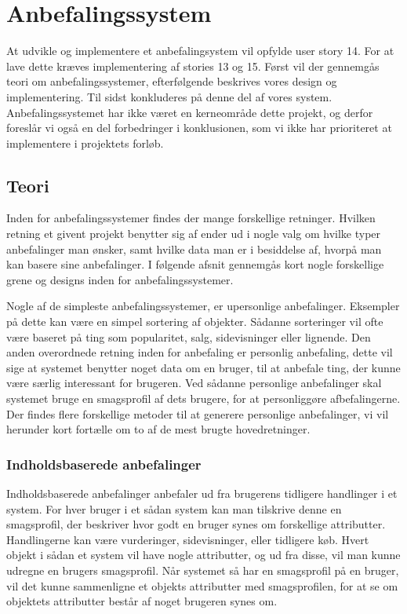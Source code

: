 \section{Anbefalingssystem}\label{anbefaling}
At udvikle og implementere et anbefalingsystem vil opfylde user story 14.
For at lave dette kræves implementering af stories 13 og 15.
Først vil der gennemgås teori om anbefalingssystemer, efterfølgende beskrives vores design og implementering.
Til sidst konkluderes på denne del af vores system.
Anbefalingssystemet har ikke været en kerneområde dette projekt, og derfor foreslår vi også en del forbedringer i konklusionen, som vi ikke har prioriteret at implementere i projektets forløb.

\subsection{Teori}
Inden for anbefalingssystemer findes der mange forskellige retninger.
Hvilken retning et givent projekt benytter sig af ender ud i nogle valg om hvilke typer anbefalinger man ønsker, samt hvilke data man er i besiddelse af, hvorpå man kan basere sine anbefalinger.
I følgende afsnit gennemgås kort nogle forskellige grene og designs inden for anbefalingssystemer.

Nogle af de simpleste anbefalingssystemer, er upersonlige anbefalinger.
Eksempler på dette kan være en simpel sortering af objekter.
Sådanne sorteringer vil ofte være baseret på ting som popularitet, salg, sidevisninger eller lignende.
Den anden overordnede retning inden for anbefaling er personlig anbefaling, dette vil sige at systemet benytter noget data om en bruger, til at anbefale ting, der kunne være særlig interessant for brugeren.
Ved sådanne personlige anbefalinger skal systemet bruge en smagsprofil af dets brugere, for at personliggøre afbefalingerne.
Der findes flere forskellige metoder til at generere personlige anbefalinger, vi vil herunder kort fortælle om to af de mest brugte hovedretninger\citep{RecommenderSystems}.

\subsubsection{Indholdsbaserede anbefalinger}
Indholdsbaserede anbefalinger anbefaler ud fra brugerens tidligere handlinger i et system.
For hver bruger i et sådan system kan man tilskrive denne en smagsprofil, der beskriver hvor godt en bruger synes om forskellige attributter.
Handlingerne kan være vurderinger, sidevisninger, eller tidligere køb.
Hvert objekt i sådan et system vil have nogle attributter, og ud fra disse, vil man kunne udregne en brugers smagsprofil.
Når systemet så har en smagsprofil på en bruger, vil det kunne sammenligne et objekts attributter med smagsprofilen, for at se om objektets attributter består af noget brugeren synes om.

